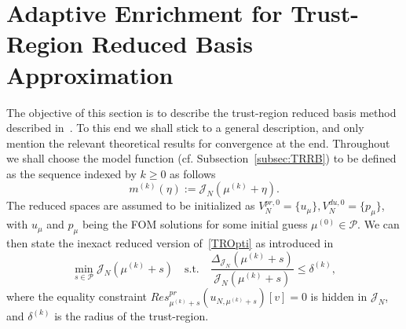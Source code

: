 \section{Adaptive Enrichment for Trust-Region Reduced Basis Approximation}

The objective of this section is to describe the trust-region reduced basis method described in~\cite[Section 4]{Keil2021}.
To this end we shall stick to a general description, and only mention the relevant theoretical results for convergence at the end.
Throughout we shall choose the model function (cf. Subsection~\ref{subsec:TRRB}) to be defined as the sequence indexed by $k \geq 0$ as follows
\begin{equation*}\label{TRModelFunc}
    m^{(k)}(\eta) := \mathcal{J}_N(\mu^{(k)} + \eta).
\end{equation*}
The reduced spaces are assumed to be initialized as $V_N^{pr, 0} = \{ u_\mu \}, V_N^{du, 0} = \{ p_\mu \}$, with $u_\mu$ and $p_\mu$ being the FOM solutions for some initial guess $\mu^{(0)} \in \mathcal{P}$.
We can then state the inexact reduced version of~\eqref{TROpti} as introduced in~\cite[Equation 51]{Qian2017}
\begin{equation}\label{TRInexactOpti}
    \min\limits_{s \in \mathcal{P}} \mathcal{J}_N(\mu^{(k)} + s) \quad \text{s.t.} \quad \frac{\Delta_{\mathcal{J}_N}(\mu^{(k)} + s)}{\mathcal{J}_N(\mu^{(k)} + s)} \leq \delta^{(k)},
\end{equation}
where the equality constraint $Res_{\mu^{(k)} + s}^{pr} (u_{N, \mu^{(k)} + s})[v] = 0$ is hidden in $\mathcal{J}_N$, and $\delta^{(k)}$ is the radius of the trust-region.





